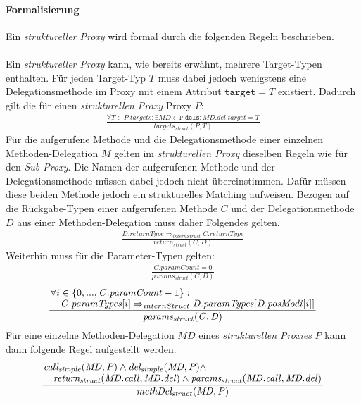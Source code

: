 \documentclass[a4paper,12pt]{article}
\begin{document}
\paragraph{Formalisierung}
Ein \emph{struktureller Proxy} wird formal durch die folgenden Regeln beschrieben.\\\\
Ein \emph{struktureller Proxy} kann, wie bereits erwähnt, mehrere Target-Typen enthalten.
Für jeden Target-Typ $T$ muss dabei jedoch wenigstens eine Delegationsmethode im Proxy mit einem Attribut $\texttt{target} = T$ existiert. Dadurch gilt die für einen \emph{strukturellen Proxy} Proxy $P$:
\begin{gather*}
\frac{\forall \mathit{T} \in \mathit{P.targets}:\exists \mathit{MD} \in \mathtt{P.dels}:\mathit{MD.del.target} = T}{\mathit{targets_{struct}(P, T)}}
\end{gather*}
Für die aufgerufene Methode und die Delegationsmethode einer einzelnen Methoden-Delegation $\mathit{M}$ gelten im \emph{strukturellen Proxy} dieselben Regeln wie für den \emph{Sub-Proxy}. Die Namen der aufgerufenen Methode und der Delegationsmethode müssen dabei jedoch nicht übereinstimmen. Dafür müssen diese beiden Methode jedoch ein strukturelles Matching aufweisen. Bezogen auf die Rückgabe-Typen einer aufgerufenen Methode $\mathit{C}$ und der Delegationsmethode $\mathit{D}$ aus einer Methoden-Delegation muss daher Folgendes gelten.
\begin{gather*}
\frac{\mathit{D.returnType} \Rightarrow_{internStruct} \mathit{C.returnType}}{\mathit{return_{struct}(C,D)}}
\end{gather*} 
Weiterhin muss für die Parameter-Typen gelten:
\begin{gather*}
\frac{\mathit{C.paramCount} = 0}{\mathit{params_{struct}(C,D)}}
\end{gather*} 
\begin{gather*}
\frac{\splitfrac{\forall \mathit{i} \in \{0,...,\mathit{C.paramCount}-1\}:}
{ \mathit{C.paramTypes}[i] \Rightarrow_{internStruct} \mathit{D.paramTypes}[\mathit{D.posModi}[i]]
}}{\mathit{params_{struct}(C,D)}}
\end{gather*} 
Für eine einzelne Methoden-Delegation $\mathit{MD}$ eines \emph{strukturellen Proxies} $P$ kann dann folgende Regel aufgestellt werden.
\begin{gather*}
\frac{\splitfrac{\mathit{call_{simple}(MD,P)} \wedge \mathit{del_{simple}(MD,P)} \wedge} {\mathit{return_{struct}(MD.call, MD.del)} \wedge \mathit{params_{struct}(MD.call, MD.del)}}
}
{\mathit{methDel_{struct}(MD,P)}}
\end{gather*}
\end{document}
